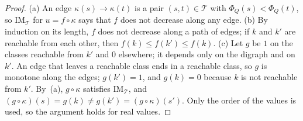\begin{proof}
(a) An edge $\kappa(s)\to\kappa(t)$ is a pair $(s,t)\in\mathcal T$ with $\Phi_Q(s)<\Phi_Q(t)$, so $\mathrm{IM}_{\mathcal T}$ for $u=f\circ\kappa$ says that $f$ does not decrease along any edge. (b) By induction on its length, $f$ does not decrease along a path of edges; if $k$ and $k'$ are reachable from each other, then $f(k)\le f(k')\le f(k)$. (c) Let $g$ be $1$ on the classes reachable from $k'$ and $0$ elsewhere; it depends only on the digraph and on $k'$. An edge that leaves a reachable class ends in a reachable class, so $g$ is monotone along the edges; $g(k')=1$, and $g(k)=0$ because $k$ is not reachable from $k'$. By~(a), $g\circ\kappa$ satisfies $\mathrm{IM}_{\mathcal T}$, and $(g\circ\kappa)(s)=g(k)\ne g(k')=(g\circ\kappa)(s')$. Only the order of the values is used, so the argument holds for real values.
\end{proof}
